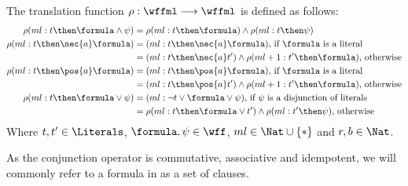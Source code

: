 \begin{definition}
    The translation function $\rho : \wffml \longrightarrow \wffml$ is defined
    as follows:
        \begin{align*}
            \rho(ml : t \then \formula \land \psi) & = \rho(ml : t \then \formula) \land \rho(ml : t \then \psi) \\
            \rho(ml : t \then \nec{a} \formula) & = (ml : t \then \nec{a} \formula) \text{, if \formula\ is a literal}\\
                                                & = (ml : t \then \nec{a} t') \land \rho(ml+1 : t' \then \formula) \text{, otherwise}\\
            \rho(ml : t \then \pos{a} \formula) & = (ml : t \then \pos{a} \formula) \text{, if \formula\ is a literal}\\
                                                & = (ml : t \then \pos{a} t') \land \rho(ml+1 : t' \then \formula) \text{, otherwise}\\
            \rho(ml : t \then \formula \lor \psi) & = (ml : \neg t \lor \formula
            \lor \psi) \text{, if $\psi$ is a disjunction of literals}\\
                                                  & = \rho(ml : t \then \formula \lor t') \land \rho(ml : t' \then \psi) \text{, otherwise}
        \end{align*}
        Where $t, t' \in \Literals$, $\formula, \psi \in \wff$, $ml \in
        \Nat \cup \{*\}$ and $r, b \in \Nat$.
\end{definition}

As the conjunction operator is commutative, associative and idempotent, we will
commonly refer to a formula in  as a set of clauses.

